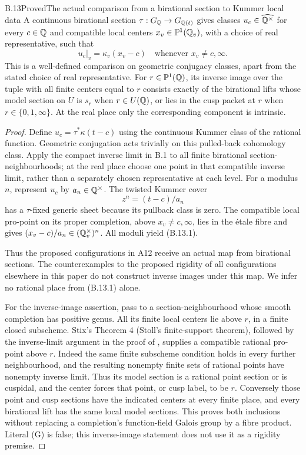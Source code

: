 \begin{statement}{B.13}{Proved}{The actual comparison from a birational section to Kummer local data}
A continuous birational section $\tau:G_\mathbb Q\to G_{\mathbb Q(t)}$ gives
classes $u_c\in\widehat{\mathbb Q^\times}$ for every $c\in\mathbb Q$ and
compatible local centers $x_v\in\mathbb P^1(\mathbb Q_v)$, with a choice of
real representative, such that
\[
 u_c|_v=\kappa_v(x_v-c)
       \quad\text{whenever }x_v\ne c,\infty.      \tag{B.13.1}
\]
This is a well-defined comparison on geometric conjugacy classes,
apart from the stated choice of real representative.
For $r\in\mathbb P^1(\mathbb Q)$, its inverse image over the tuple with all
finite centers equal to $r$ consists exactly of the birational
lifts whose model section on $U$ is $s_r$ when $r\in U(\mathbb Q)$,
or lies in the cusp packet at $r$ when $r\in\{0,1,\infty\}$.
At the real place only the corresponding component is intrinsic.
\end{statement}
\begin{proof}
Define $u_c=\tau^*\kappa(t-c)$ using the continuous Kummer class
of the rational function.  Geometric conjugation acts trivially
on this pulled-back cohomology class.  Apply the compact inverse
limit in B.1 to all finite birational section-neighbourhoods;
at the real place choose one point in that compatible inverse
limit, rather than a separately chosen representative at each
level.  For a modulus $n$, represent $u_c$ by $a_n\in\mathbb Q^\times$.
The twisted Kummer cover
\[
                       z^n=(t-c)/a_n
\]
has a $\tau$-fixed generic sheet because its pullback class is
zero.  The compatible local pro-point on its proper completion,
above $x_v\ne c,\infty$, lies in the \'etale fibre and gives
$(x_v-c)/a_n\in(\mathbb Q_v^\times)^n$.  All moduli yield (B.13.1).

Thus the proposed configurations in A12 receive an actual map
from birational sections.  The counterexamples to the proposed
rigidity of all configurations elsewhere in this paper do not
construct inverse images under this map.  We infer no rational
place from (B.13.1) alone.

For the inverse-image assertion, pass to a section-neighbourhood
whose smooth completion has positive genus.  All its finite
local centers lie above $r$, in a finite closed subscheme.
Stix's Theorem 4 (Stoll's finite-support theorem), followed by
the inverse-limit argument in the proof of
\cite[Corollary 5]{BIR_Stix2015}, supplies a compatible rational
pro-point above $r$.  Indeed the same finite subscheme condition
holds in every further neighbourhood, and the resulting nonempty
finite sets of rational points have nonempty inverse limit.
Thus its model section is a rational point section or is cuspidal,
and the center forces that point, or cusp label, to be $r$.
Conversely those point and cusp sections have the indicated
centers at every finite place, and every birational lift has the
same local model sections.  This proves both inclusions without
replacing a completion's function-field Galois group by a fibre
product.  Literal (G) is false; this inverse-image statement does
not use it as a rigidity premise.
\end{proof}

